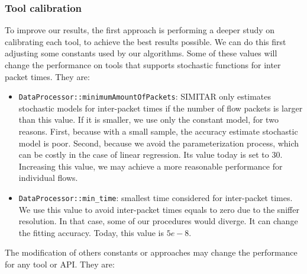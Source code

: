 \subsubsection{Tool calibration}

To improve our results, the first approach is performing a deeper study on calibrating each tool, to achieve the best results possible. We can do this first adjusting some constants used by our algorithms. Some of these values will change the performance on tools that supports stochastic functions for inter packet times. They are:

\begin{itemize}
	\item \texttt{DataProcessor::minimumAmountOfPackets}: SIMITAR only estimates stochastic models for inter-packet times if the number of flow packets is larger than this value. If it is smaller, we use only the constant model, for two reasons. First, because with a small sample, the accuracy estimate stochastic model is poor. Second, because we avoid the parameterization process, which can be costly in the case of linear regression. Its value today is set to 30. Increasing this value, we may achieve a more reasonable performance for individual flows. 
	\item \texttt{DataProcessor::min\_time}: smallest time considered for inter-packet times. We use this value to avoid inter-packet times equals to zero due to the sniffer resolution. In that case, some of our procedures would diverge. It can change the fitting accuracy. Today, this value is $5e-8$. 
\end{itemize}

The modification of others  constants or approaches may change the performance for any tool or API. They are:

